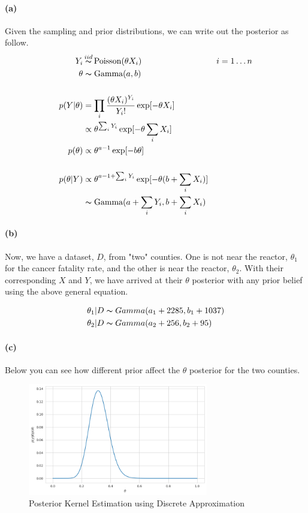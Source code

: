 \documentclass[11pt, letterpaper]{article}
\begin{document}
\paragraph{(a)}
Given the sampling and prior distributions, we can write out the posterior as follow.
\begin{align*}
    Y_i &\mathop{\thicksim}^{iid} \text{Poisson}(\theta X_i) && i = 1 \dots n \\
    \theta &\thicksim \text{Gamma}(a, b) \\ \\
    p(Y|\theta) &= \prod_i \frac{(\theta X_i)^{Y_i}}{Y_i !} \exp[-\theta X_i] \\
        &\propto \theta^{\sum_i Y_i} \exp[-\theta \sum_i X_i] \\
    p(\theta) &\propto \theta^{a-1} \exp[-b\theta] \\ \\
    p(\theta|Y) &\propto \theta^{a - 1 + \sum_i Y_i} \exp[-\theta(b+\sum_i X_i)] \\
        &\thicksim \text{Gamma}(a + \sum_i Y_i, b+\sum_i X_i)
\end{align*}

\paragraph{(b)}
Now, we have a dataset, $D$, from "two" counties. One is not near the reactor, $\theta_1$ for the cancer fatality rate, and the other is near the reactor, $\theta_2$. With their corresponding $X$ and $Y$, we have arrived at their $\theta$ posterior with any prior belief using the above general equation.

\begin{align*}
    \theta_1|D &\thicksim Gamma(a_1 + 2285, b_1 + 1037) \\
    \theta_2|D &\thicksim Gamma(a_2 + 256, b_2 + 95)
\end{align*}

\paragraph{(c)}
Below you can see how different prior affect the $\theta$ posterior for the two counties.

\begin{figure}[!h]
  \centering
  \includegraphics[width=0.7\textwidth]{4.4.a.png}
  \captionsetup{justification=centering}
  \caption{Posterior Kernel Estimation using Discrete Approximation}
\end{figure}
\end{document}
